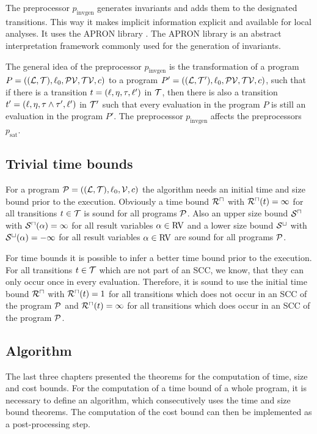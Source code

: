 The preprocessor $p_{\text{invgen}}$ generates invariants and adds them to the designated transitions.
This way it makes implicit information explicit and available for local analyses.
It uses the APRON library \cite{apron}.
The APRON library is an abstract interpretation framework commonly used for the generation of invariants.

The general idea of the preprocessor $p_{\text{invgen}}$ is the transformation of a program $P = ((\mathcal{L}, \mathcal{T}), \ell_0, \mathcal{PV}, \mathcal{TV}, c)$ to a program $P' = ((\mathcal{L}, \mathcal{T}'), \ell_0, \mathcal{PV}, \mathcal{TV}, c)$, such that if there is a transition $t = (\ell, \eta, \tau, \ell')$ in $\mathcal{T}$, then there is also a transition $t' = (\ell, \eta, \tau \wedge \tau', \ell')$ in $\mathcal{T}'$ such that every evaluation in the program $P$ is still an evaluation in the program $P'$.
The preprocessor $p_{\text{invgen}}$ affects the preprocessors $p_{\text{sat}}$.

\subsection{Trivial time bounds}

For a program $\mathcal{P} = ((\mathcal{L}, \mathcal{T}), \ell_0, \mathcal{V}, c)$ the algorithm needs an initial time and size bound prior to the execution.
Obviously a time bound ${\mathcal{R}^\sqcap}$ with ${\mathcal{R}^\sqcap}(t) = \infty$ for all transitions $t \in \mathcal{T}$ is sound for all programs $\mathcal{P}$.
Also an upper size bound ${\mathcal{S}^\sqcap}$ with ${\mathcal{S}^\sqcap}(\alpha) = \infty$ for all result variables $\alpha \in \text{RV}$ and a lower size bound ${\mathcal{S}^\sqcup}$ with ${\mathcal{S}^\sqcup}(\alpha) = -\infty$ for all result variables $\alpha \in \text{RV}$ are sound for all programs $\mathcal{P}$.

For time bounds it is possible to infer a better time bound prior to the execution.
For all transitions $t \in \mathcal{T}$ which are not part of an SCC, we know, that they can only occur once in every evaluation.
Therefore, it is sound to use the initial time bound ${\mathcal{R}^\sqcap}$ with ${\mathcal{R}^\sqcap}(t) = 1$ for all transitions which does not occur in an SCC of the program $\mathcal{P}$ and ${\mathcal{R}^\sqcap}(t) = \infty$ for all transitions which does occur in an SCC of the program $\mathcal{P}$.

\subsection{Algorithm}

The last three chapters presented the theorems for the computation of time, size and cost bounds.
For the computation of a time bound of a whole program, it is necessary to define an algorithm, which consecutively uses the time and size bound theorems.
The computation of the cost bound can then be implemented as a post-processing step.

